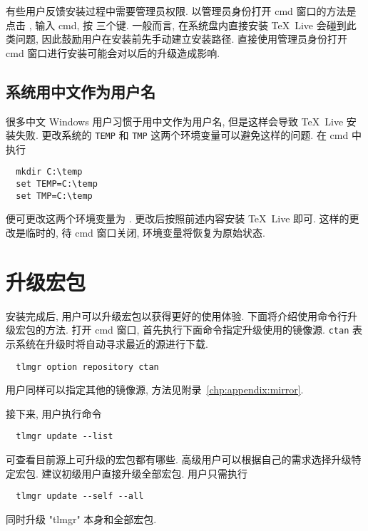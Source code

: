 有些用户反馈安装过程中需要管理员权限.
以管理员身份打开 \textsf{cmd} 窗口的方法是点击 \keys{\faWindows},
输入 \textsf{cmd},
按 \keys{\ctrl + \shift + \enter} 三个键.
一般而言,
在系统盘内直接安装 \TeX~Live 会碰到此类问题,
因此鼓励用户在安装前先手动建立安装路径.
直接使用管理员身份打开 \textsf{cmd} 窗口进行安装可能会对以后的升级造成影响.

\subsection{系统用中文作为用户名}\label{sec:chinesename}

很多中文 Windows 用户习惯于用中文作为用户名,
但是这样会导致 \TeX~Live 安装失败.
更改系统的 \texttt{TEMP} 和 \texttt{TMP} 这两个环境变量可以避免这样的问题.
在 \textsf{cmd} 中执行
\begin{lstlisting}
  mkdir C:\temp
  set TEMP=C:\temp
  set TMP=C:\temp
\end{lstlisting}
便可更改这两个环境变量为 .
更改后按照前述内容安装 \TeX~Live 即可.
这样的更改是临时的,
待 \textsf{cmd} 窗口关闭,
环境变量将恢复为原始状态.

\section{升级宏包}\label{sec:windows:update}

安装完成后, 用户可以升级宏包以获得更好的使用体验. 
下面将介绍使用命令行升级宏包的方法. 
打开 \textsf{cmd} 窗口, 首先执行下面命令指定升级使用的镜像源. 
\texttt{ctan} 表示系统在升级时将自动寻求最近的源进行下载. 
\begin{lstlisting}
  tlmgr option repository ctan
\end{lstlisting}
用户同样可以指定其他的镜像源,
方法见附录~\ref{chp:appendix:mirror}.

接下来, 用户执行命令
\begin{lstlisting}
  tlmgr update --list
\end{lstlisting}
可查看目前源上可升级的宏包都有哪些. 
高级用户可以根据自己的需求选择升级特定宏包.
建议初级用户直接升级全部宏包. 
用户只需执行
\begin{lstlisting}
  tlmgr update --self --all
\end{lstlisting}
同时升级 "tlmgr" 本身和全部宏包. 

